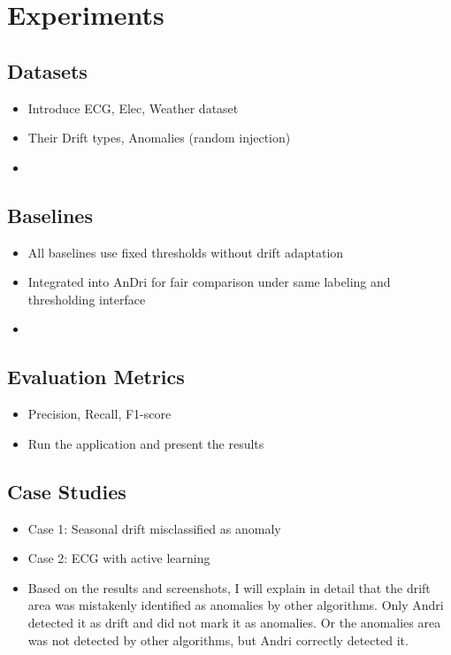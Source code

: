 \chapter{Experiments}

\section{Datasets}
\begin{itemize}
    \item Introduce ECG, Elec, Weather dataset
    \item Their Drift types, Anomalies (random injection)
    \item {}
\end{itemize}

\section{Baselines}
\begin{itemize}
    \item All baselines use fixed thresholds without drift adaptation
    \item Integrated into AnDri for fair comparison under same labeling and thresholding interface
    \item {}
\end{itemize}

\section{Evaluation Metrics}
\begin{itemize}
    \item Precision, Recall, F1-score  
    \item Run the application and present the results  
\end{itemize}

\section{Case Studies}
\begin{itemize}
    \item Case 1: Seasonal drift misclassified as anomaly
    \item Case 2: ECG with active learning
    \item  Based on the results and screenshots, I will explain in detail that the drift area was mistakenly identified as anomalies by other algorithms. Only Andri detected it as drift and did not mark it as anomalies. Or the anomalies area was not detected by other algorithms, but Andri correctly detected it.
    
\end{itemize}

